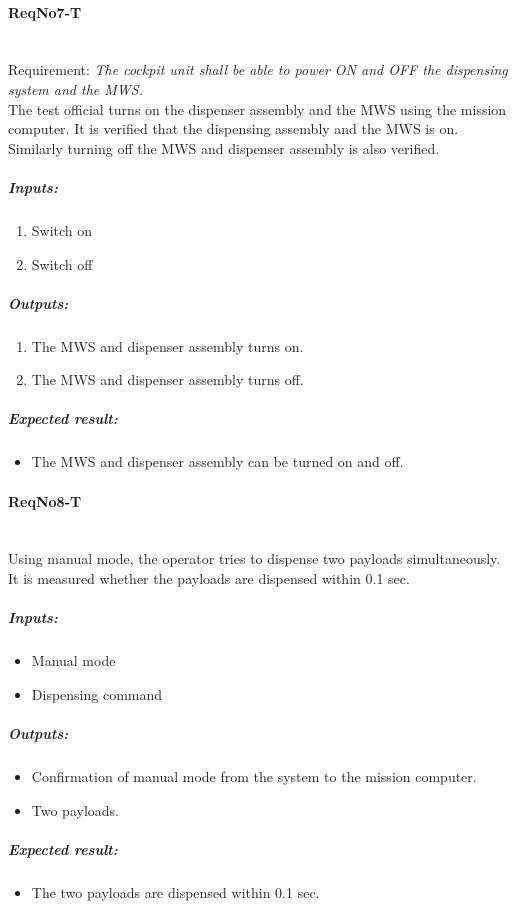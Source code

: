 \paragraph{ReqNo7-T}\mbox{}\\ %
Requirement: \textit{The cockpit unit shall be able to power ON and OFF the dispensing system and the MWS.}
\\
The test official turns on the dispenser assembly and the MWS using the mission computer. It is verified that the dispensing assembly and the MWS is on. Similarly turning off the MWS and dispenser assembly is also verified.

\subparagraph{Inputs:}
	\begin{enumerate}
	\item Switch on
	\item Switch off
	\end{enumerate}
	\subparagraph{Outputs:}
	\begin{enumerate}
	\item The MWS and dispenser assembly turns on.
	\item The MWS and dispenser assembly turns off.
	\end{enumerate}
	\subparagraph{Expected result:}
	\begin{itemize}
	\item The MWS and dispenser assembly can be turned on and off.
	\end{itemize}


\paragraph{ReqNo8-T}\mbox{}\\ %
Using manual mode, the operator tries to dispense two payloads simultaneously. It is measured whether the payloads are dispensed within 0.1 sec.
\\
	\subparagraph{Inputs:}
	\begin{itemize}
	\item Manual mode
	\item Dispensing command
	\end{itemize}
	\subparagraph{Outputs:}
	\begin{itemize}
	\item Confirmation of manual mode from the system to the mission computer.
	\item Two payloads.
	\end{itemize}
	\subparagraph{Expected result:}
	\begin{itemize}
	\item The two payloads are dispensed within 0.1 sec.
	\end{itemize}

